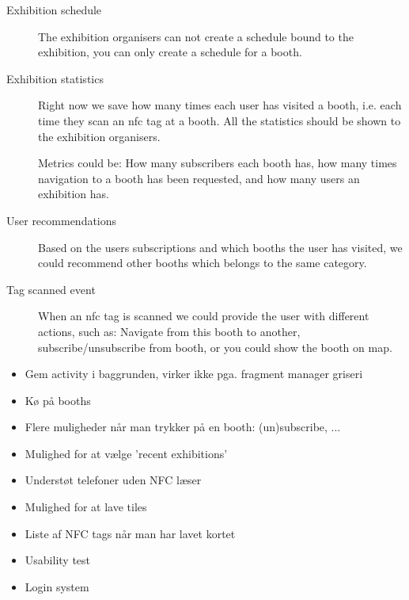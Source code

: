\begin{description}
\item[Exhibition schedule] The exhibition organisers can not create a schedule bound to the exhibition, you can only create a schedule for a booth.%
\item[Exhibition statistics] Right now we save how many times each user has visited a booth, i.e. each time they scan an \ac{nfc} tag at a booth. All the statistics should be shown to the exhibition organisers.

Metrics could be: How many subscribers each booth has, how many times navigation to a booth has been requested, and how many users an exhibition has.
\item[User recommendations] Based on the users subscriptions and which booths the user has visited, we could recommend other booths which belongs to the same category.
\item[Tag scanned event] When an \ac{nfc} tag is scanned we could provide the user with different actions, such as: Navigate from this booth to another, subscribe/unsubscribe from booth, or you could show the booth on map.
\end{description}

\begin{itemize}
\item Gem activity i baggrunden, virker ikke pga. fragment manager griseri
\item Kø på booths
\item Flere muligheder når man trykker på en booth: (un)subscribe, ...
\item Mulighed for at vælge 'recent exhibitions'
\item Understøt telefoner uden NFC læser
\item Mulighed for at lave tiles
\item Liste af NFC tags når man har lavet kortet
\item Usability test
\item Login system
\end{itemize}